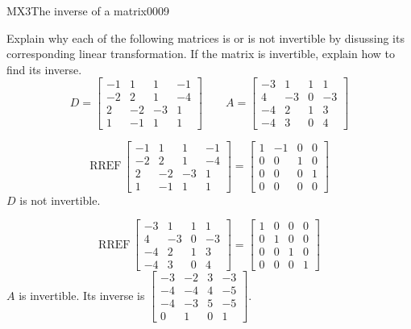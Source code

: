 \begin{exercise}{MX3}{The inverse of a matrix}{0009} 
\begin{exerciseStatement} 

 Explain why each of the following matrices is or is not invertible by disussing its corresponding linear transformation. If the matrix is invertible, explain how to find its inverse. \[
\hspace{2em}
D = \left[\begin{array}{cccc}
-1 & 1 & 1 & -1 \\
-2 & 2 & 1 & -4 \\
2 & -2 & -3 & 1 \\
1 & -1 & 1 & 1
\end{array}\right]
\hspace{2em}
A = \left[\begin{array}{cccc}
-3 & 1 & 1 & 1 \\
4 & -3 & 0 & -3 \\
-4 & 2 & 1 & 3 \\
-4 & 3 & 0 & 4
\end{array}\right]
\hspace{2em}
        \] 

 \end{exerciseStatement}
 \begin{exerciseAnswer} 

 \[\mathrm{RREF}\,\left[\begin{array}{cccc}
-1 & 1 & 1 & -1 \\
-2 & 2 & 1 & -4 \\
2 & -2 & -3 & 1 \\
1 & -1 & 1 & 1
\end{array}\right]=\left[\begin{array}{cccc}
1 & -1 & 0 & 0 \\
0 & 0 & 1 & 0 \\
0 & 0 & 0 & 1 \\
0 & 0 & 0 & 0
\end{array}\right]\] \(D\) is not invertible. 

 

 \[\mathrm{RREF}\,\left[\begin{array}{cccc}
-3 & 1 & 1 & 1 \\
4 & -3 & 0 & -3 \\
-4 & 2 & 1 & 3 \\
-4 & 3 & 0 & 4
\end{array}\right]=\left[\begin{array}{cccc}
1 & 0 & 0 & 0 \\
0 & 1 & 0 & 0 \\
0 & 0 & 1 & 0 \\
0 & 0 & 0 & 1
\end{array}\right]\] \(A\) is invertible. Its inverse is \(\left[\begin{array}{cccc}
-3 & -2 & 3 & -3 \\
-4 & -4 & 4 & -5 \\
-4 & -3 & 5 & -5 \\
0 & 1 & 0 & 1
\end{array}\right]\). 

 \end{exerciseAnswer}
 \end{exercise}


